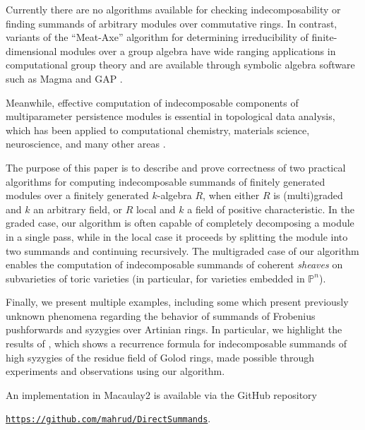 \documentclass[12pt]{article}
\def\PP{\mathbb P}
\theoremstyle{theorem}
\numberwithin{thm}{section}
\theoremstyle{definition}
\begin{document}
Currently there are no algorithms available for checking indecomposability or finding summands of arbitrary modules over commutative rings. In contrast, variants of the ``Meat-Axe'' algorithm for determining irreducibility of finite-dimensional modules over a group algebra have wide ranging applications in computational group theory \cite{Parker84,HR94,Holt98} and are available through symbolic algebra software such as Magma and GAP \cite{MAGMA,GAP}.

Meanwhile, effective computation of indecomposable components of multiparameter persistence modules is essential in topological data analysis, which has been applied to computational chemistry, materials science, neuroscience, and many other areas \cite{BL23}.

The purpose of this paper is to describe and prove correctness of two practical algorithms for computing indecomposable summands of finitely generated modules over a finitely generated $k$-algebra $R$, when either $R$ is (multi)graded and $k$ an arbitrary field, or $R$ local and $k$ a field of positive characteristic.
In the graded case, our algorithm is often capable of completely decomposing a module in a single pass, while in the local case it proceeds by splitting the module into two summands and continuing recursively.
The multigraded case of our algorithm enables the computation of indecomposable summands of coherent \emph{sheaves} on subvarieties of toric varieties (in particular, for varieties embedded in $\PP^n$).

Finally, we present multiple examples, including some which present previously unknown phenomena regarding the behavior of summands of Frobenius pushforwards and syzygies over Artinian rings. In particular, we highlight the results of \cite{CDE24}, which shows a recurrence formula for indecomposable summands of high syzygies of the residue field of Golod rings, made possible through experiments and observations using our algorithm.

An implementation in Macaulay2 \cite{M2} is available via the GitHub repository \\
\centerline{
  \href{https://github.com/mahrud/DirectSummands}
       {\texttt{https://github.com/mahrud/DirectSummands}}.}

\end{document}
